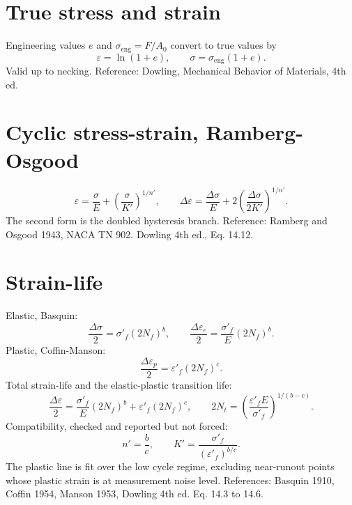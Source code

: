 \documentclass[11pt]{article}
\begin{document}
\section{True stress and strain}
Engineering values \(e\) and \(\sigma_\text{eng}=F/A_0\) convert to true values by
\begin{equation}
\varepsilon = \ln(1+e), \qquad \sigma = \sigma_\text{eng}(1+e).
\end{equation}
Valid up to necking. Reference: Dowling, Mechanical Behavior of Materials, 4th ed.

\section{Cyclic stress-strain, Ramberg-Osgood}
\begin{equation}
\varepsilon = \frac{\sigma}{E} + \left(\frac{\sigma}{K'}\right)^{1/n'},
\qquad
\Delta\varepsilon = \frac{\Delta\sigma}{E} + 2\left(\frac{\Delta\sigma}{2K'}\right)^{1/n'}.
\end{equation}
The second form is the doubled hysteresis branch. Reference: Ramberg and Osgood
1943, NACA TN 902. Dowling 4th ed., Eq. 14.12.

\section{Strain-life}
Elastic, Basquin:
\begin{equation}
\frac{\Delta\sigma}{2} = \sigma'_f (2N_f)^{b},
\qquad
\frac{\Delta\varepsilon_e}{2} = \frac{\sigma'_f}{E}(2N_f)^{b}.
\end{equation}
Plastic, Coffin-Manson:
\begin{equation}
\frac{\Delta\varepsilon_p}{2} = \varepsilon'_f (2N_f)^{c}.
\end{equation}
Total strain-life and the elastic-plastic transition life:
\begin{equation}
\frac{\Delta\varepsilon}{2} = \frac{\sigma'_f}{E}(2N_f)^{b} + \varepsilon'_f (2N_f)^{c},
\qquad
2N_t = \left(\frac{\varepsilon'_f E}{\sigma'_f}\right)^{1/(b-c)}.
\end{equation}
Compatibility, checked and reported but not forced:
\begin{equation}
n' = \frac{b}{c}, \qquad K' = \frac{\sigma'_f}{(\varepsilon'_f)^{b/c}}.
\end{equation}
The plastic line is fit over the low cycle regime, excluding near-runout points
whose plastic strain is at measurement noise level. References: Basquin 1910,
Coffin 1954, Manson 1953, Dowling 4th ed. Eq. 14.3 to 14.6.
\end{document}
